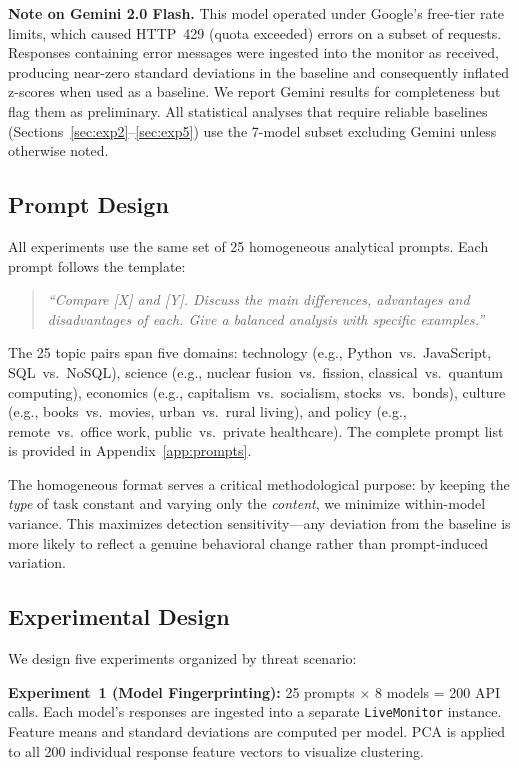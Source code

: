 \documentclass[11pt,twocolumn]{article}
\begin{document}
\noindent\textbf{Note on Gemini 2.0 Flash.}
This model operated under Google's free-tier rate limits, which caused HTTP~429 (quota exceeded) errors on a subset of requests.
Responses containing error messages were ingested into the monitor as received, producing near-zero standard deviations in the baseline and consequently inflated z-scores when used as a baseline.
We report Gemini results for completeness but flag them as preliminary.
All statistical analyses that require reliable baselines (Sections~\ref{sec:exp2}--\ref{sec:exp5}) use the 7-model subset excluding Gemini unless otherwise noted.

\subsection{Prompt Design}
\label{sec:prompts}

All experiments use the same set of 25 homogeneous analytical prompts.
Each prompt follows the template:

\begin{quote}
\small\textit{``Compare [X] and [Y]. Discuss the main differences, advantages and disadvantages of each. Give a balanced analysis with specific examples.''}
\end{quote}

The 25 topic pairs span five domains: technology (e.g., Python~vs.~JavaScript, SQL~vs.~NoSQL), science (e.g., nuclear fusion~vs.~fission, classical~vs.~quantum computing), economics (e.g., capitalism~vs.~socialism, stocks~vs.~bonds), culture (e.g., books~vs.~movies, urban~vs.~rural living), and policy (e.g., remote~vs.~office work, public~vs.~private healthcare).
The complete prompt list is provided in Appendix~\ref{app:prompts}.

The homogeneous format serves a critical methodological purpose: by keeping the \emph{type} of task constant and varying only the \emph{content}, we minimize within-model variance.
This maximizes detection sensitivity---any deviation from the baseline is more likely to reflect a genuine behavioral change rather than prompt-induced variation.

\subsection{Experimental Design}
\label{sec:experiments}

We design five experiments organized by threat scenario:

\textbf{Experiment~1 (Model Fingerprinting):}
25 prompts $\times$ 8 models = 200 API calls.
Each model's responses are ingested into a separate \texttt{LiveMonitor} instance.
Feature means and standard deviations are computed per model.
PCA is applied to all 200 individual response feature vectors to visualize clustering.
\end{document}
